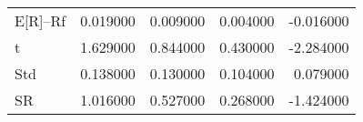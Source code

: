 \begin{tabular}{lrrrr}
\toprule
\midrule
E[R]--Rf & 0.019000 & 0.009000 & 0.004000 & -0.016000 \\
t & 1.629000 & 0.844000 & 0.430000 & -2.284000 \\
Std & 0.138000 & 0.130000 & 0.104000 & 0.079000 \\
SR & 1.016000 & 0.527000 & 0.268000 & -1.424000 \\
\bottomrule
\end{tabular}
